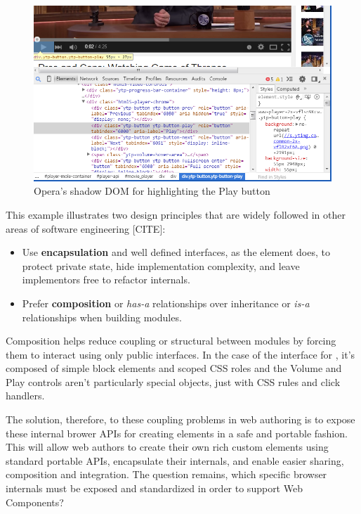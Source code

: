 % 
\begin{figure}[htb]
\centering
 \includegraphics[width=5.5in]{images/html5_video_control.png}
\caption{Opera's shadow DOM for  highlighting the Play button}
\label{f:html5video}
\end{figure}
%

This example illustrates two design principles that are widely followed in other areas of software engineering [CITE]:
\begin{itemize}
\item Use \textbf{encapsulation} and well defined interfaces, as the  element does, to protect private state, hide implementation complexity, and leave implementors free to refactor internals.
\item Prefer \textbf{composition} or \textit{has-a} relationships over inheritance or \textit{is-a} relationships when building modules. 
\end{itemize}

Composition helps reduce coupling or structural between modules by forcing them to interact using only public interfaces.
In the case of the interface for , it's composed of simple block elements and scoped CSS roles and the Volume and Play controls aren't particularly special objects, just  with CSS rules and click handlers.

The solution, therefore, to these coupling problems in web authoring is to expose these internal brower APIs for creating elements in a safe and portable fashion. 
This will allow web authors to create their own rich custom elements using standard portable APIs, encapsulate their internals, and enable easier sharing, composition and integration.
The question remains, which specific browser internals must be exposed and standardized in order to support Web Components?

